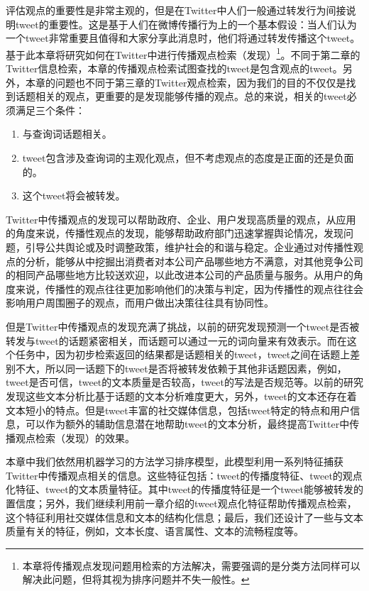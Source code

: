 评估观点的重要性是非常主观的，但是在Twitter中人们一般通过转发行为间接说明tweet的重要性。这是基于人们在微博传播行为上的一个基本假设：当人们认为一个tweet非常重要且值得和大家分享此消息时，他们将通过转发传播这个tweet。基于此本章将研究如何在Twitter中进行传播观点检索（发现）\footnote{本章将传播观点发现问题用检索的方法解决，需要强调的是分类方法同样可以解决此问题，但将其视为排序问题并不失一般性。}。不同于第二章的Twitter信息检索，本章的传播观点检索试图查找的tweet是包含观点的tweet。另外，本章的问题也不同于第三章的Twitter观点检索，因为我们的目的不仅仅是找到话题相关的观点，更重要的是发现能够传播的观点。总的来说，相关的tweet必须满足三个条件：
  \begin{enumerate}
  \item 与查询词话题相关。
  \item tweet包含涉及查询词的主观化观点，但不考虑观点的态度是正面的还是负面的。
  \item 这个tweet将会被转发。
  \end{enumerate} 


Twitter中传播观点的发现可以帮助政府、企业、用户发现高质量的观点，从应用的角度来说，传播性观点的发现，能够帮助政府部门迅速掌握舆论情况，发现问题，引导公共舆论或及时调整政策，维护社会的和谐与稳定。企业通过对传播性观点的分析，能够从中挖掘出消费者对本公司产品哪些地方不满意，对其他竞争公司的相同产品哪些地方比较送欢迎，以此改进本公司的产品质量与服务。从用户的角度来说，传播性的观点往往更加影响他们的决策与判定，因为传播性的观点往往会影响用户周围圈子的观点，而用户做出决策往往具有协同性。

但是Twitter中传播观点的发现充满了挑战，以前的研究发现预测一个tweet是否被转发与tweet的话题紧密相关，而话题可以通过一元的词向量来有效表示。而在这个任务中，因为初步检索返回的结果都是话题相关的tweet，tweet之间在话题上差别不大，所以同一话题下的tweet是否将被转发依赖于其他非话题因素，例如，tweet是否可信，tweet的文本质量是否较高，tweet的写法是否规范等。以前的研究发现这些文本分析比基于话题的文本分析难度更大，另外，tweet的文本还存在着文本短小的特点。但是tweet丰富的社交媒体信息，包括tweet特定的特点和用户信息，可以作为额外的辅助信息潜在地帮助tweet的文本分析，最终提高Twitter中传播观点检索（发现）的效果。

本章中我们依然用机器学习的方法学习排序模型，此模型利用一系列特征捕获Twitter中传播观点相关的信息。这些特征包括：tweet的传播度特征、tweet的观点化特征、tweet的文本质量特征。其中tweet的传播度特征是一个tweet能够被转发的置信度；另外，我们继续利用前一章介绍的tweet观点化特征帮助传播观点检索，这个特征利用社交媒体信息和文本的结构化信息；最后，我们还设计了一些与文本质量有关的特征，例如，文本长度、语言属性、文本的流畅程度等。

